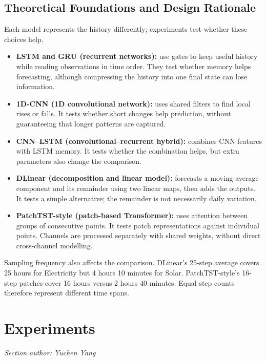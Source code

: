 \documentclass[11pt,a4paper]{article}
\newcommand{\sectionauthor}[1]{\noindent\textit{Section author: #1}\par\vspace{3pt}}
\begin{document}
\subsection{Theoretical Foundations and Design Rationale}
Each model represents the history differently; experiments test whether these choices help.
\begin{itemize}
\item \textbf{LSTM and GRU (recurrent networks):} use gates to keep useful history while reading observations in time order. They test whether memory helps forecasting, although compressing the history into one final state can lose information.
\item \textbf{1D-CNN (1D convolutional network):} uses shared filters to find local rises or falls. It tests whether short changes help prediction, without guaranteeing that longer patterns are captured.
\item \textbf{CNN--LSTM (convolutional--recurrent hybrid):} combines CNN features with LSTM memory. It tests whether the combination helps, but extra parameters also change the comparison.
\item \textbf{DLinear (decomposition and linear model):} forecasts a moving-average component and its remainder using two linear maps, then adds the outputs. It tests a simple alternative; the remainder is not necessarily daily variation.
\item \textbf{PatchTST-style (patch-based Transformer):} uses attention between groups of consecutive points. It tests patch representations against individual points. Channels are processed separately with shared weights, without direct cross-channel modelling.
\end{itemize}
Sampling frequency also affects the comparison. DLinear's 25-step average covers 25 hours for Electricity but 4 hours 10 minutes for Solar. PatchTST-style's 16-step patches cover 16 hours versus 2 hours 40 minutes. Equal step counts therefore represent different time spans.

\FloatBarrier
\section{Experiments}\label{sec:experiments}
\sectionauthor{Yuchen Yang}
\end{document}
